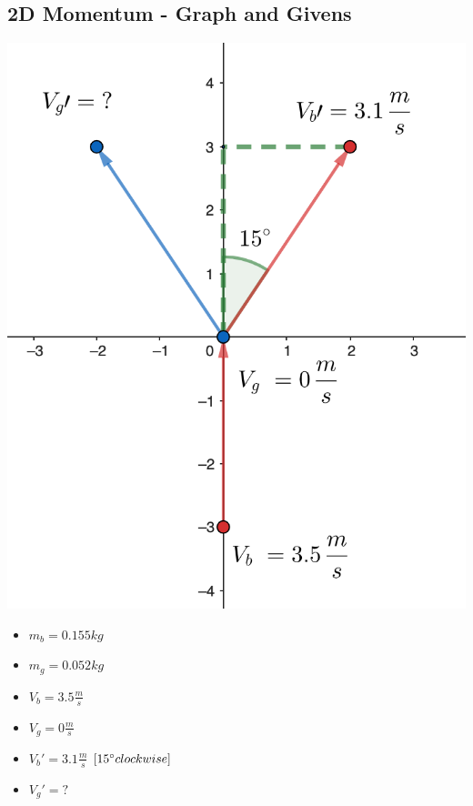 \documentclass{article}
\begin{document}
\begin{adjustwidth}{1cm}{0pt}
    \subsection*{2D Momentum - Graph and Givens}
    \begin{minipage}{0.5\textwidth}
        \includegraphics[scale=0.33]{./images/2d_momentum_graph}
    \end{minipage}
    \begin{minipage}{0.5\textwidth}
        \begin{itemize}
            \item $m_{b} = 0.155kg$
            \item $m_{g} = 0.052kg$
            \item $V_{b} = 3.5\frac{m}{s}$
            \item $V_{g} = 0\frac{m}{s}$
            \item $V_{b}\prime = 3.1\frac{m}{s}$ $[15\degree clockwise]$
            \item $V_{g}\prime = ?$
        \end{itemize}
    \end{minipage}

\end{adjustwidth}
\end{document}
